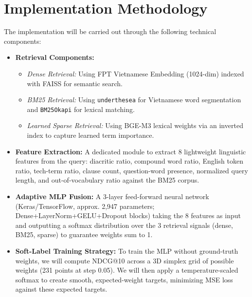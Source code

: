 \documentclass[11pt,a4paper]{article}
\begin{document}
\section{Implementation Methodology}
The implementation will be carried out through the following technical components:
\begin{itemize}[leftmargin=*]
    \item \textbf{Retrieval Components:}
    \begin{itemize}
        \item \emph{Dense Retrieval:} Using FPT Vietnamese Embedding (1024-dim) indexed with FAISS for semantic search.
        \item \emph{BM25 Retrieval:} Using \texttt{underthesea} for Vietnamese word segmentation and \texttt{BM25Okapi} for lexical matching.
        \item \emph{Learned Sparse Retrieval:} Using BGE-M3 lexical weights via an inverted index to capture learned term importance.
    \end{itemize}
    \item \textbf{Feature Extraction:} A dedicated module to extract 8 lightweight linguistic features from the query: diacritic ratio, compound word ratio, English token ratio, tech-term ratio, clause count, question-word presence, normalized query length, and out-of-vocabulary ratio against the BM25 corpus.
    \item \textbf{Adaptive MLP Fusion:} A 3-layer feed-forward neural network (Keras/TensorFlow, approx. 2,947 parameters; Dense+LayerNorm+GELU+Dropout blocks) taking the 8 features as input and outputting a softmax distribution over the 3 retrieval signals (dense, BM25, sparse) to guarantee weights sum to 1.
    \item \textbf{Soft-Label Training Strategy:} To train the MLP without ground-truth weights, we will compute NDCG@10 across a 3D simplex grid of possible weights (231 points at step 0.05). We will then apply a temperature-scaled softmax to create smooth, expected-weight targets, minimizing MSE loss against these expected targets.
\end{itemize}
\end{document}
